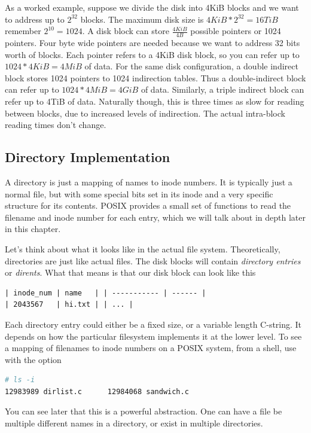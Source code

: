As a worked example, suppose we divide the disk into 4KiB blocks and we want to address up to $2^{32}$ blocks.
The maximum disk size is $4KiB *2^{32} = 16TiB$ remember $2^{10} = 1024$.
A disk block can store $\frac{4KiB}{4B}$ possible pointers or 1024 pointers.
Four byte wide pointers are needed because we want to address 32 bits worth of blocks.
Each pointer refers to a 4KiB disk block, so you can refer up to $1024*4KiB = 4MiB$ of data.
For the same disk configuration, a double indirect block stores 1024 pointers to 1024 indirection tables.
Thus a double-indirect block can refer up to $1024 * 4MiB = 4GiB$ of data.
Similarly, a triple indirect block can refer up to 4TiB of data.
Naturally though, this is three times as slow for reading between blocks, due to increased levels of indirection.
The actual intra-block reading times don't change.

\subsection{Directory Implementation}

A directory is just a mapping of names to inode numbers.
It is typically just a normal file, but with some special bits set in its inode and a very specific structure for its contents.
POSIX provides a small set of functions to read the filename and inode number for each entry, which we will talk about in depth later in this chapter.

Let's think about what it looks like in the actual file system.
Theoretically, directories are just like actual files.
The disk blocks will contain \emph{directory entries} or \emph{dirents}.
What that means is that our disk block can look like this

\begin{verbatim}
| inode_num | name   | | ----------- | ------ |
| 2043567   | hi.txt | | ... |
\end{verbatim}

Each directory entry could either be a fixed size, or a variable length C-string.
It depends on how the particular filesystem implements it at the lower level.
To see a mapping of filenames to inode numbers on a POSIX system, from a shell, use  with the  option

\begin{lstlisting}[language=bash]
# ls -i
12983989 dirlist.c      12984068 sandwich.c
\end{lstlisting}

You can see later that this is a powerful abstraction.
One can have a file be multiple different names in a directory, or exist in multiple directories.

